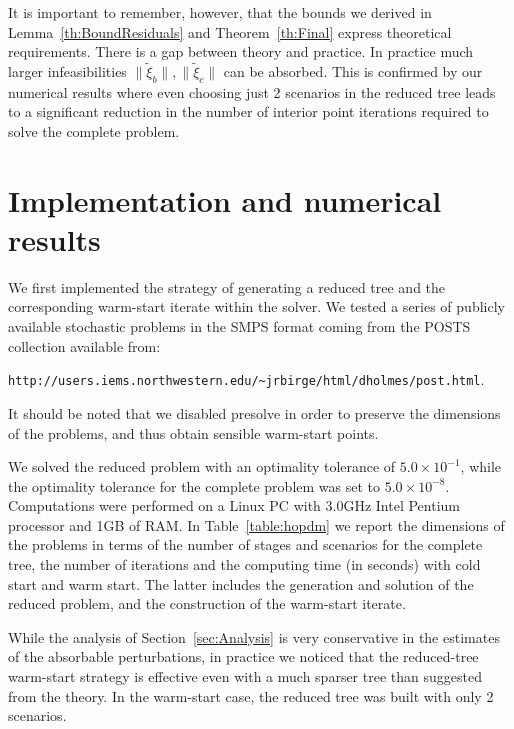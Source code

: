 It is important to remember, however,
that the bounds we derived in Lemma~\ref{th:BoundResiduals}
and Theorem~\ref{th:Final} express theoretical requirements.
There is a gap between theory and
practice. In practice much larger infeasibilities 
$\|\tilde{\xi}_b\|, \|\tilde{\xi}_c\|$ can be absorbed. This is
confirmed by our numerical results where even choosing just 2
scenarios in the reduced tree leads to a significant reduction in the
number of interior point iterations required to solve the complete problem.


%
%
\section{Implementation and numerical results}
\label{sec:Results}

We first implemented the strategy of generating a reduced tree and 
the corresponding warm-start iterate within the \HOPDM \cite{Gondzio96} 
solver. We tested a series of publicly available stochastic problems in 
the SMPS format \cite{SMPS} coming from the POSTS collection 
available from:
\begin{center}
{\tt http://users.iems.northwestern.edu/\~{}jrbirge/html/dholmes/post.html}.
\end{center}
%
%
It should be noted that we disabled presolve %
in order to preserve the dimensions of the problems, and thus obtain 
sensible warm-start points.

We solved the reduced problem with an optimality tolerance of 
$5.0\times 10^{-1}$, while the optimality tolerance for the complete 
problem was set to $5.0\times 10^{-8}$. 
Computations were performed on a Linux PC with 3.0GHz Intel Pentium 
processor and 1GB of RAM.
In Table~\ref{table:hopdm} we report the dimensions of the problems 
in terms of the number of stages and scenarios for the complete 
tree, the number of iterations and the computing time (in seconds) 
with cold start and warm start. The latter includes the generation 
and solution of the reduced problem, and the construction of the 
warm-start iterate.

While the analysis of Section~\ref{sec:Analysis} is very conservative
in the estimates of the absorbable perturbations, in practice we noticed
that the reduced-tree warm-start strategy is effective even with
a much sparser tree than suggested from the theory.
In the warm-start case, the reduced tree was built with only 2 scenarios.

